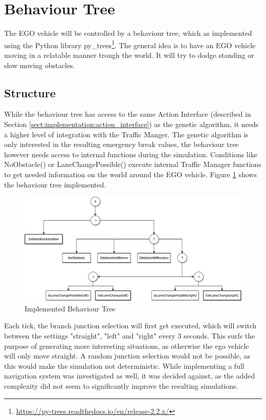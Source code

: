 \section{Behaviour Tree}
The EGO vehicle will be controlled by a behaviour tree, which as implemented using the Python library py\_trees\footnote{\href{https://py-trees.readthedocs.io/en/release-2.2.x/}{https://py-trees.readthedocs.io/en/release-2.2.x/}}. The general idea is to have an EGO vehicle moving in a relatable manner trough the world. It will try to dodge standing or slow moving obstacles.  

\subsection{Structure}
While the behaviour tree has access to the same Action Interface (described in Section \ref{sect:implementation:action_interface}) as the genetic algorithm, it needs a higher level of integration with the Traffic Manger. The genetic algorithm is only interested in the resulting emergency break values, the behaviour tree however needs access to internal functions during the simulation. Conditions like NoObstacle() or LaneChangePossible() execute internal Traffic Manager functions to get needed information on the world around the EGO vehicle. Figure \ref{fig:implementation:bt} shows the behaviour tree implemented.

\begin{figure}[ht] 
	\includegraphics[width=1\linewidth]{figures/behaviorTree}
	\caption{Implemented Behaviour Tree}
	\label{fig:implementation:bt}
\end{figure}

Each tick, the branch junction selection will first get executed, which will switch between the settings "straight", "left" and "right" every 3 seconds. This surfs the purpose of generating more interesting situations, as otherwise the ego vehicle will only move straight. A random junction selection would not be possible, as this would make the simulation not deterministic. While implementing a full navigation system was investigated as well, it was decided against, as the added complexity did not seem to significantly improve the resulting simulations.

